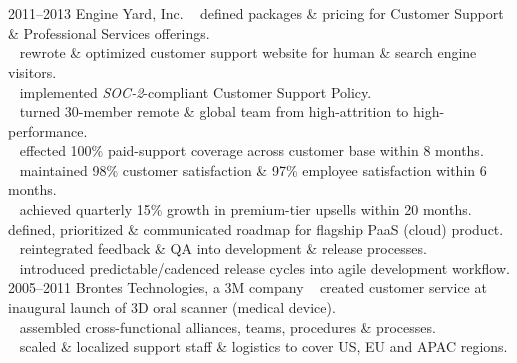 \documentclass[]{friggeri-cv} %
\begin{document}
\section{{}{} {\normalsize{}~~}}

\begin{entrylist}
\entry
{2011--2013}
{Engine Yard, Inc.}
{}
{%
{\tiny {}} ~ defined packages \& pricing for Customer Support \& Professional Services offerings.\\
{\tiny {}} ~ rewrote \& optimized customer support website for human \& search engine visitors.\\
{\tiny {}} ~ implemented \emph{SOC-2}-compliant Customer Support Policy.\\
{\tiny {}} ~ turned 30-member remote \& global team from high-attrition to high-performance.\\

{\tiny {}} ~ effected 100\% paid-support coverage across customer base within 8 months.\\
{\tiny {}} ~ maintained 98\% customer satisfaction \& 97\% employee satisfaction within 6 months.\\
{\tiny {}} ~ achieved quarterly 15\% growth in premium-tier upsells within 20 months.%
}
\entry
{}
{}
{}
{%
{\tiny {}} ~ defined, prioritized \& communicated roadmap for flagship PaaS (cloud) product.\\
{\tiny {}} ~ reintegrated feedback \& QA into development \& release processes.\\
{\tiny {}} ~ introduced predictable/cadenced release cycles into agile development workflow.\\%
}
\entry
{2005--2011}
{Brontes Technologies, a 3M company}
{}
{{\tiny {}} ~ created customer service at inaugural launch of 3D oral scanner (medical device).\\
{\tiny {}} ~ assembled cross-functional alliances, teams, procedures \& processes.\\
{\tiny {}} ~ scaled \& localized support staff \& logistics to cover US, EU and APAC regions.\\

}
\end{entrylist}
\end{document}
